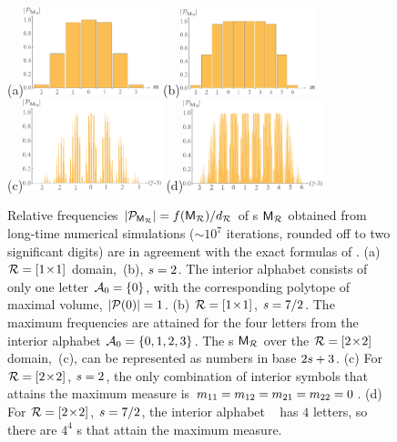 \documentclass[12pt]{iopart}
\begin{document}
\begin{figure}	
\begin{center}
(a)\;\includegraphics[width=0.35\textwidth]{RJsymbol-a}
  \hspace{4mm}
(b)\;\includegraphics[width=0.35\textwidth]{RJsymbol-b}\\
  \vspace{4mm}
(c)\;\includegraphics[width=0.36\textwidth]{RJsymbol-c}
  \hspace{4mm}
(d)\;\includegraphics[width=0.36\textwidth]{RJsymbol-d}
\end{center}
\caption{\label{fig:RJsymbol}
Relative frequencies $|\mathcal{P}_{\mathsf{M}_{\mathcal{R}}}| = f({\mathsf{M}_{\mathcal{R}}})/{d_{\mathcal{R}}}$ of {\brick s}
${\mathsf{M}_{\mathcal{R}}}$ obtained from long-time numerical simulations ($\sim10^7$
iterations, rounded off to two significant  digits) are in agreement with
the exact formulas of .
    (a) $\mathcal{R}=[1\!\times\!1]$ domain, \,(b), $s=2$.
The interior alphabet  consists of only one letter
$\mathcal{A}_0=\{0\}$, with the corresponding polytope of maximal volume,
$|\mathcal{P}(0)|=1$.
    (b) $\mathcal{R}=[1\!\times\!1]$, $s=7/2$.
The maximum frequencies are attained for the four letters
 from the interior alphabet $\mathcal{A}_0=\{0,1,2,3\}$.
The {\brick s} ${\mathsf{M}_{\mathcal{R}}}$
over the $\mathcal{R}=[2\!\times\!2]$ {\spt} domain, \,(c),
can be represented as numbers  
in base $2s+3$.
    (c) For $\mathcal{R}=[2\!\times\!2]$,  $s=2$,
the only combination of interior symbols that attains the maximum measure
is ${m_{11}}={m_{12}}= {m_{21}}={m_{22}}=0$.
    (d) For $\mathcal{R}=[2\!\times\!2]$, $s=7/2$,
the interior alphabet \Ai\  has $4$ letters, so
there are $4^4$ \brick s that attain the maximum measure.
    }
\end{figure}
\end{document}
